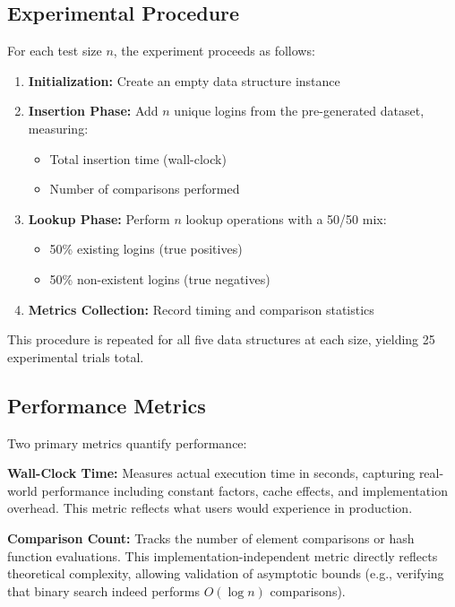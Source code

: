 \subsection{Experimental Procedure}

For each test size $n$, the experiment proceeds as follows:

\begin{enumerate}
    \item \textbf{Initialization:} Create an empty data structure instance
    \item \textbf{Insertion Phase:} Add $n$ unique logins from the pre-generated dataset, measuring:
    \begin{itemize}
        \item Total insertion time (wall-clock)
        \item Number of comparisons performed
    \end{itemize}
    \item \textbf{Lookup Phase:} Perform $n$ lookup operations with a 50/50 mix:
    \begin{itemize}
        \item 50\% existing logins (true positives)
        \item 50\% non-existent logins (true negatives)
    \end{itemize}
    \item \textbf{Metrics Collection:} Record timing and comparison statistics
\end{enumerate}

This procedure is repeated for all five data structures at each size, yielding 25 experimental trials total.

\subsection{Performance Metrics}

Two primary metrics quantify performance:

\textbf{Wall-Clock Time:} Measures actual execution time in seconds, capturing real-world performance including constant factors, cache effects, and implementation overhead. This metric reflects what users would experience in production.

\textbf{Comparison Count:} Tracks the number of element comparisons or hash function evaluations. This implementation-independent metric directly reflects theoretical complexity, allowing validation of asymptotic bounds (e.g., verifying that binary search indeed performs $O(\log n)$ comparisons).

